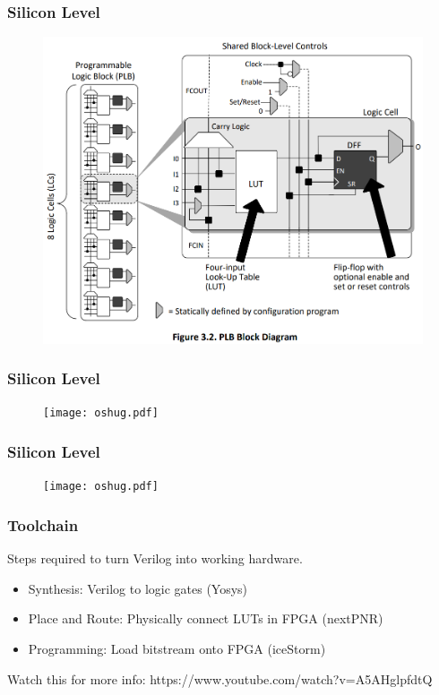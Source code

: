 \documentclass[t]{beamer}
\begin{document}

\begin{frame}[t]
	\frametitle{Silicon Level}
	\begin{figure}
		\includegraphics[width=0.8\linewidth]{plb-internals.png}
	\end{figure}
\end{frame}


\begin{frame}[t]
	\frametitle{Silicon Level}
	\begin{figure}
		\texttt{[image: oshug.pdf]}
	\end{figure}
\end{frame}


\begin{frame}[t]
	\frametitle{Silicon Level}
	\begin{figure}
		\texttt{[image: oshug.pdf]}
	\end{figure}
\end{frame}


\begin{frame}[t]
	\frametitle{Toolchain}
	Steps required to turn Verilog into working hardware.
	\begin{itemize}
		\item Synthesis: Verilog to logic gates (Yosys)
		\item Place and Route: Physically connect LUTs in FPGA (nextPNR)
		\item Programming: Load bitstream onto FPGA (iceStorm)
	\end{itemize}
	Watch this for more info: https://www.youtube.com/watch?v=A5AHglpfdtQ
\end{frame}
\end{document}

